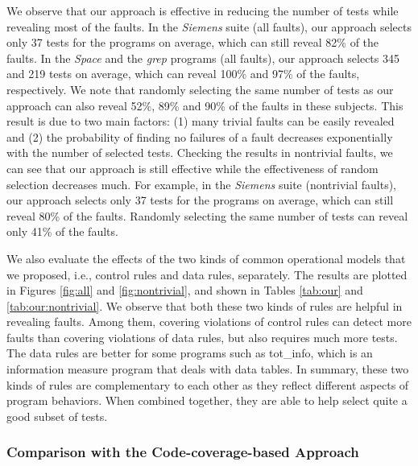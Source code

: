 \documentclass{sig-alternate}
\begin{document}
We observe that our approach is effective in reducing the number of
tests while revealing most of the faults. In the \emph{Siemens}
suite (all faults), our approach selects only 37 tests for the
programs on average, which can still reveal 82\% of the faults. In
the \emph{Space} and the \emph{grep} programs (all faults), our
approach selects 345 and 219 tests on average, which can reveal
100\% and 97\% of the faults, respectively. We note that randomly
selecting the same number of tests as our approach can also reveal
52\%, 89\% and 90\% of the faults in these subjects. This result is
due to two main factors: (1) many trivial faults can be easily
revealed and (2) the probability of finding no failures of a fault
decreases exponentially with the number of selected tests. Checking
the results in nontrivial faults, we can see that our approach is
still effective while the effectiveness of random selection
decreases much. For example, in the \emph{Siemens} suite (nontrivial
faults), our approach selects only 37 tests for the programs on
average, which can still reveal 80\% of the faults. Randomly
selecting the same number of tests can reveal only 41\% of the
faults.

We also evaluate the effects of the two kinds of common operational
models that we proposed, i.e., control rules and data rules,
separately. The results are plotted in Figures \ref{fig:all} and
\ref{fig:nontrivial}, and shown in Tables \ref{tab:our} and
\ref{tab:our:nontrivial}. We observe that both these two kinds of
rules are helpful in revealing faults. Among them, covering
violations of control rules can detect more faults than covering
violations of data rules, but also requires much more tests. The
data rules are better for some programs such as tot\_info, which is
an information measure program that deals with data tables. In
summary, these two kinds of rules are complementary to each other as
they reflect different aspects of program behaviors. When combined
together, they are able to help select quite a good subset of tests.




\subsubsection{Comparison with the Code-coverage-based Approach}
\end{document}
